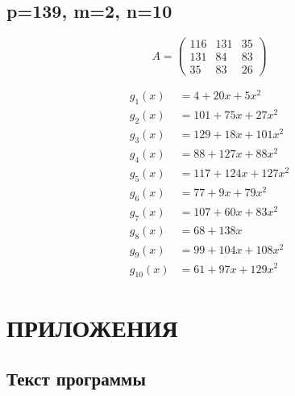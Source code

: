 \documentclass[a4paper,12pt]{article}
\begin{document}
	\subsection{p=139, m=2, n=10}
	
	\[
	A = \begin{pmatrix}
		116 & 131 & 35 \\
		131 & 84  & 83 \\
		35  & 83  & 26
	\end{pmatrix}
	\]
	
	\begin{align*}	
		g_1(x) &= 4 + 20 x + 5 x^2      \\
		g_2(x) &= 101 + 75 x + 27 x^2   \\
		g_3(x) &= 129 + 18 x + 101 x^2  \\
		g_4(x) &= 88 + 127 x + 88 x^2   \\
		g_5(x) &= 117 + 124 x + 127 x^2 \\
		g_6(x) &= 77 + 9 x + 79 x^2	    \\
		g_7(x) &= 107 + 60 x + 83 x^2   \\
		g_8(x) &= 68 + 138 x            \\
		g_9(x) &= 99 + 104 x + 108 x^2  \\
		g_{10}(x) &= 61 + 97 x + 129 x^2
	\end{align*}
	
	\newpage
	\renewcommand\thesubsection{\Asbuk{subsection}}
	
	\section*{ПРИЛОЖЕНИЯ}
		\subsection{Текст программы} \label{program}
	

	
		
\end{document}
